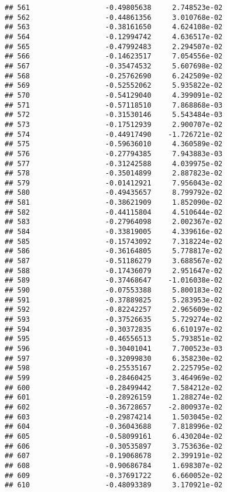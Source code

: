 \documentclass[
]{article}
\begin{document}
\begin{verbatim}
## 561                  -0.49805638     2.748523e-02
## 562                  -0.44861356     3.010768e-02
## 563                  -0.38161650     4.624108e-02
## 564                  -0.12994742     4.636517e-02
## 565                  -0.47992483     2.294507e-02
## 566                  -0.14623517     7.054556e-02
## 567                  -0.35474532     5.607698e-02
## 568                  -0.25762690     6.242509e-02
## 569                  -0.52552062     5.935822e-02
## 570                  -0.54129040     4.399091e-02
## 571                  -0.57118510     7.868868e-03
## 572                  -0.31530146     5.543484e-03
## 573                  -0.17512939     2.900707e-02
## 574                  -0.44917490    -1.726721e-02
## 575                  -0.59636010     4.360589e-02
## 576                  -0.27794385     7.943883e-03
## 577                  -0.31242588     4.039975e-02
## 578                  -0.35014899     2.887823e-02
## 579                  -0.01412921     7.956043e-02
## 580                  -0.49435657     8.799792e-02
## 581                  -0.38621909     1.852090e-02
## 582                  -0.44115804     4.510644e-02
## 583                  -0.27964098     2.002367e-02
## 584                  -0.33819005     4.339616e-02
## 585                  -0.15743092     7.318224e-02
## 586                  -0.36164805     5.778817e-02
## 587                  -0.51186279     3.688567e-02
## 588                  -0.17436079     2.951647e-02
## 589                  -0.37468647    -1.016038e-02
## 590                  -0.07553388     5.800183e-02
## 591                  -0.37889825     5.283953e-02
## 592                  -0.82242257     2.965609e-02
## 593                  -0.37526635     5.729274e-02
## 594                  -0.30372835     6.610197e-02
## 595                  -0.46556513     5.793851e-02
## 596                  -0.30401041     7.700523e-03
## 597                  -0.32099830     6.358230e-02
## 598                  -0.25535167     2.225795e-02
## 599                  -0.28460425     3.464969e-02
## 600                  -0.28499442     7.584212e-02
## 601                  -0.28926159     1.288274e-02
## 602                  -0.36728657    -2.800937e-02
## 603                  -0.29874214     1.503045e-02
## 604                  -0.36043688     7.818996e-02
## 605                  -0.58099161     6.430204e-02
## 606                  -0.30535897     3.753636e-02
## 607                  -0.19068678     2.399191e-02
## 608                  -0.90686784     1.698307e-02
## 609                  -0.37691722     6.660052e-02
## 610                  -0.48093389     3.170921e-02

\end{verbatim}
\end{document}
